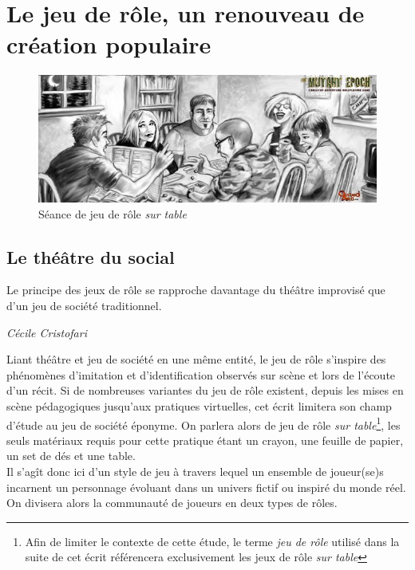 \section{Le jeu de rôle, un renouveau de création populaire}

\begin{figure}[h!]
    \centering
    \includegraphics[width=0.85\linewidth]{img/rpg_tabletop1.jpg}
    \caption{Séance de jeu de rôle \textit{sur table}}
\end{figure}

\subsection{Le théâtre du social}

\begin{shadequote}
Le principe des jeux de rôle se rapproche davantage du théâtre improvisé que d'un jeu de société traditionnel. \par\emph{C{\'e}cile Cristofari \cite{cristofari2010lecteur}}
\end{shadequote}

Liant théâtre et jeu de société en une même entité, le jeu de rôle s'inspire des phénomènes d'imitation et d'identification observés sur scène et lors de l'écoute d'un récit. Si de nombreuses variantes du jeu de rôle existent, depuis les mises en scène pédagogiques jusqu'aux pratiques virtuelles, cet écrit limitera son champ d'étude au jeu de société éponyme. On parlera alors de jeu de rôle \textit{sur table}\footnote{Afin de limiter le contexte de cette étude, le terme \textit{jeu de rôle} utilisé dans la suite de cet écrit référencera exclusivement les jeux de rôle \textit{sur table}}, les seuls matériaux requis pour cette pratique étant un crayon, une feuille de papier, un set de dés et une table.\\

Il s'agît donc ici d'un style de jeu à travers lequel un ensemble de joueur(se)s incarnent un personnage évoluant dans un univers fictif ou inspiré du monde réel. On divisera alors la communauté de joueurs en deux types de rôles.

